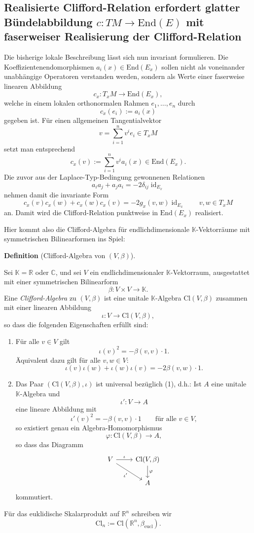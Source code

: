 \documentclass[10pt, letterpaper]{article}
\newcommand{\id}{\operatorname{id}}
\newcommand{\End}{\mathrm{End}}
\newcommand{\Cl}{\mathrm{Cl}}
\newcommand{\CustomHeading}[3]{%
  \par\medskip\noindent%
  \textbf{#1 #2} \textnormal{(#3)}.\enskip%
}
\newenvironment{DEF}[2]{\CustomHeading{Definition}{#1}{#2}}{}
\begin{document}
\subsection{Realisierte Clifford-Relation erfordert glatter Bündelabbildung $c:TM\longrightarrow \End(E)$ mit faserweiser Realisierung der Clifford-Relation}


Die bisherige lokale Beschreibung lässt sich nun invariant formulieren. Die Koeffizientenendomorphismen \(a_i(x)\in \End(E_x)\) sollen nicht als voneinander unabhängige Operatoren verstanden werden, sondern als Werte einer faserweise linearen Abbildung
\[
c_x:T_xM\longrightarrow \End(E_x),
\]
welche in einem lokalen orthonormalen Rahmen \(e_1,\dots,e_n\) durch
\[
c_x(e_i):=a_i(x)
\]
gegeben ist. Für einen allgemeinen Tangentialvektor
\[
v=\sum_{i=1}^n v^i e_i\in T_xM
\]
setzt man entsprechend
\[
c_x(v):=\sum_{i=1}^n v^i a_i(x)\in \End(E_x).
\]
Die zuvor aus der Laplace-Typ-Bedingung gewonnenen Relationen
\[
a_i a_j+a_j a_i=-2\delta_{ij}\id_{E_x}
\]
nehmen damit die invariante Form
\[
c_x(v)c_x(w)+c_x(w)c_x(v)=-2g_x(v,w)\id_{E_x}
\qquad v,w\in T_xM
\]
an. Damit wird die Clifford-Relation punktweise in \(\End(E_x)\) realisiert.

Hier kommt also die Clifford-Algebra für endlichdimensionale $\mathbb{K}$-Vektorräume mit symmetrischen Bilinearformen ins Spiel: 


\begin{DEF}{}{Clifford-Algebra von \((V,\beta)\)}
Sei \(\mathbb{K}=\mathbb{R}\) oder \(\mathbb{C}\), und sei \(V\) ein endlichdimensionaler
\(\mathbb{K}\)-Vektorraum, ausgestattet mit einer symmetrischen Bilinearform
\[
\beta:V\times V\to \mathbb{K}.
\]
Eine \emph{Clifford-Algebra} zu \((V,\beta)\) ist eine unitale \(\mathbb{K}\)-Algebra
\(\Cl(V,\beta)\) zusammen mit einer linearen Abbildung
\[
\iota:V\to \Cl(V,\beta),
\]
so dass die folgenden Eigenschaften erfüllt sind:

\begin{enumerate}
    \item Für alle \(v\in V\) gilt
    \[
    \iota(v)^2=-\beta(v,v)\cdot 1.
    \]
    Äquivalent dazu gilt für alle \(v,w\in V\):
    \[
    \iota(v)\iota(w)+\iota(w)\iota(v)=-2\beta(v,w)\cdot 1.
    \]

    \item Das Paar \((\Cl(V,\beta),\iota)\) ist universal bezüglich (1), d.h.:
    Ist \(A\) eine unitale \(\mathbb{K}\)-Algebra und
    \[
    \iota':V\to A
    \]
    eine lineare Abbildung mit
    \[
    \iota'(v)^2=-\beta(v,v)\cdot 1
    \qquad\text{für alle }v\in V,
    \]
    so existiert genau ein Algebra-Homomorphismus
    \[
    \varphi:\Cl(V,\beta)\to A,
    \]
    so dass das Diagramm
    \[
    \begin{tikzcd}
    V \arrow[r, "\iota"] \arrow[dr, "\iota'"'] & \Cl(V,\beta) \arrow[d, "\varphi"] \\
    & A
    \end{tikzcd}
    \]
    kommutiert.
\end{enumerate}

Für das euklidische Skalarprodukt auf \(\mathbb{R}^n\) schreiben wir
\[
\Cl_n:=\Cl(\mathbb{R}^n,\beta_{\mathrm{eucl}}).
\]
\end{DEF}
\bigskip
\end{document}
